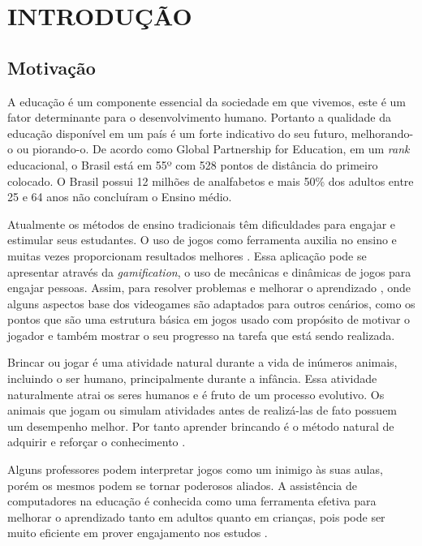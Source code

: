 \chapter{INTRODUÇÃO}
\label{Introducao}

\section{Motivação}

A educação é um componente essencial da sociedade em que vivemos, este é um fator determinante para o desenvolvimento humano. Portanto a qualidade da educação disponível em um país é um forte indicativo do seu futuro, melhorando-o ou piorando-o. De acordo como  Global Partnership for Education, em um \textit{rank} educacional, o Brasil está em 55º com 528 pontos de distância do primeiro colocado. O Brasil possui 12 milhões de analfabetos e mais 50\% dos adultos entre 25 e 64 anos não concluíram o Ensino médio.

Atualmente os métodos de ensino tradicionais têm dificuldades para engajar e estimular seus estudantes. O uso de jogos como ferramenta auxilia no ensino e muitas vezes proporcionam resultados melhores \cite{Girard&Ecalle&Magnan:13}. Essa aplicação pode se apresentar através da \textit{gamification}, o uso de mecânicas e dinâmicas de jogos para engajar pessoas. Assim, para resolver problemas e melhorar o aprendizado ,  onde alguns aspectos base dos videogames são adaptados para outros cenários, como os pontos que  são uma estrutura básica em jogos \cite{Zichermann&Cunningham:11} usado com propósito de motivar o jogador e também mostrar o seu progresso na tarefa que está sendo realizada.

Brincar ou jogar é uma atividade natural durante a vida de inúmeros animais, incluindo o ser humano, principalmente durante a infância. Essa atividade naturalmente atrai os seres humanos e é fruto de um processo evolutivo. Os animais que jogam ou simulam atividades antes de realizá-las de fato possuem um desempenho melhor. Por tanto aprender brincando é o método natural de adquirir e reforçar o conhecimento \cite{Bekoff&DiMotta:08}.

Alguns professores podem interpretar jogos como um inimigo às suas aulas, porém os mesmos podem se tornar poderosos aliados. A assistência de computadores na educação é conhecida como uma ferramenta efetiva para melhorar o aprendizado tanto em adultos quanto em crianças, pois pode ser muito eficiente em prover engajamento nos estudos \cite{Girard&Ecalle&Magnan:13}.

